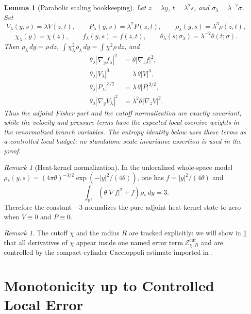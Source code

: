 \documentclass[11pt]{amsart}
\numberwithin{equation}{section}
\theoremstyle{plain}
\newtheorem{lemma}[theorem]{Lemma}
\theoremstyle{definition}
\theoremstyle{remark}
\newtheorem{remark}[theorem]{Remark}
\newcommand{\R}{\mathbb R}
\newcommand{\Err}{\mathcal E}
\begin{document}
\begin{lemma}[Parabolic scaling bookkeeping]
\label{lem:scaling-bookkeeping}
\label{rem:scaling}
Let \(z=\lambda y\), \(t=\lambda^2s\), and
\(\sigma_\lambda=\lambda^{-2}\sigma\).  Set
\[
	V_\lambda(y,s)=\lambda V(z,t),\qquad
	P_\lambda(y,s)=\lambda^2P(z,t),\qquad
	\rho_\lambda(y,s)=\lambda^3\rho(z,t),
\]
\[
	\chi_\lambda(y)=\chi(z),\qquad
	f_\lambda(y,s)=f(z,t),\qquad
	\theta_\lambda(s;\sigma_\lambda)=\lambda^{-2}\theta(t;\sigma).
\]
Then \(\rho_\lambda\,dy=\rho\,dz\),
\(\int\chi_\lambda^2\rho_\lambda\,dy=\int\chi^2\rho\,dz\), and
\[
\begin{aligned}
	\theta_\lambda|\nabla_y f_\lambda|^2
	&=\theta|\nabla_z f|^2,\\
	\theta_\lambda|V_\lambda|^3
	&=\lambda\,\theta|V|^3,\\
	\theta_\lambda|P_\lambda|^{3/2}
	&=\lambda\,\theta|P|^{3/2},\\
	\theta_\lambda|\nabla_y V_\lambda|^2
	&=\lambda^2\theta|\nabla_z V|^2 .
\end{aligned}
\]
Thus the adjoint Fisher part and the cutoff normalization are exactly
covariant, while the velocity and pressure terms have the expected local
coercive weights in the renormalized branch variables.  The entropy
identity below uses these terms as a controlled local budget; no standalone
scale-invariance assertion is used in the proof.
\end{lemma}

\begin{remark}[Heat-kernel normalization]
In the unlocalized whole-space model
\(\rho_*(y,s)=(4\pi\theta)^{-3/2}\exp(-|y|^2/(4\theta))\), one has
\(f=|y|^2/(4\theta)\) and
\[
	\int_{\R^3}(\theta|\nabla f|^2+f)\rho_*\,dy=3.
\]
Therefore the constant \(-3\) normalizes the pure adjoint heat-kernel state
to zero when \(V\equiv0\) and \(P\equiv0\).
\end{remark}

\begin{remark}\label{rem:cutoff-track}
The cutoff \(\chi\) and the radius \(R\) are tracked explicitly: we will
show in \cref{sec:monotonicity} that all derivatives of \(\chi\) appear
inside one named error term \(\Err^{\mathrm{cut}}_{\chi,R}\) and are
controlled by the compact-cylinder Caccioppoli estimate
imported in .
\end{remark}

\section{Monotonicity up to Controlled Local Error}
\label{sec:monotonicity}
\end{document}
